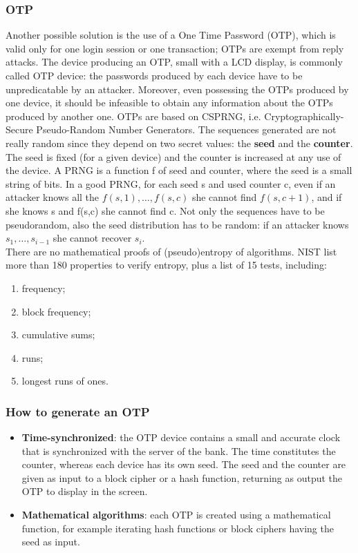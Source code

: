 \documentclass[a4paper, 10pt, titlepage]{article}
\begin{document}
\subsubsection{OTP}
Another possible solution is the use of a One Time Password (OTP), which is valid only for one login session or one transaction; OTPs are exempt from reply attacks. The device producing an OTP, small with a LCD display, is commonly called OTP device: the passwords produced by each device have to be unpredicatable by an attacker. Moreover, even possessing the OTPs produced by one device, it should be infeasible to obtain any information about the OTPs produced by another one. OTPs are based on CSPRNG, i.e. Cryptographically-Secure Pseudo-Random Number Generators. The sequences generated are not really random since they depend on two secret values: the \textbf{seed} and the \textbf{counter}. The seed is fixed (for a given device) and the counter is increased at any use of the device. A PRNG is a function f of seed and counter, where the seed is a small string of bits. In a good PRNG, for each seed s and used counter c, even if an attacker knows all the $f(s,1), \dots, f(s,c)$ she cannot find $f(s, c+1)$, and if she knows s and f(s,c) she cannot find c. Not only the sequences have to be pseudorandom, also the seed distribution has to be random: if an attacker knows $s_1, \dots, s_{i-1}$ she cannot recover $s_i$. \medskip\\
There are no mathematical proofs of (pseudo)entropy of algorithms. NIST list more than 180 properties to verify entropy, plus a list of 15 tests, including:
\begin{enumerate}
\item frequency;
\item block frequency;
\item cumulative sums;
\item runs;
\item longest runs of ones.
\end{enumerate}

\subsubsection*{How to generate an OTP}
\begin{itemize}
\item \textbf{Time-synchronized}: the OTP device contains a small and accurate clock that is synchronized with the server of the bank. The time constitutes the counter, whereas each device has its own seed. The seed and the counter are given as input to a block cipher or a hash function, returning as output the OTP to display in the screen.
\item \textbf{Mathematical algorithms}: each OTP is created using a mathematical function, for example iterating hash functions or block ciphers having the seed as input.
\end{itemize}
\end{document}
